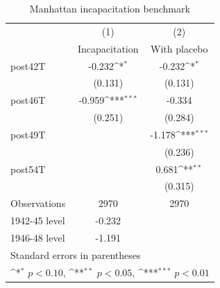 \begin{table}[htbp]\centering
\def\sym#1{\ifmmode^{#1}\else\(^{#1}\)\fi}
\caption{Manhattan incapacitation benchmark}
\begin{tabular}{l*{2}{c}}
\toprule
                    &\multicolumn{1}{c}{(1)}&\multicolumn{1}{c}{(2)}\\
                    &\multicolumn{1}{c}{Incapacitation}&\multicolumn{1}{c}{With placebo}\\
\midrule
post42T             &      -0.232\sym{*}  &      -0.232\sym{*}  \\
                    &     (0.131)         &     (0.131)         \\
\addlinespace
post46T             &      -0.959\sym{***}&      -0.334         \\
                    &     (0.251)         &     (0.284)         \\
\addlinespace
post49T             &                     &      -1.178\sym{***}\\
                    &                     &     (0.236)         \\
\addlinespace
post54T             &                     &       0.681\sym{**} \\
                    &                     &     (0.315)         \\
\midrule
Observations        &        2970         &        2970         \\
1942-45 level       &      -0.232         &                     \\
1946-48 level       &      -1.191         &                     \\
\bottomrule
\multicolumn{3}{l}{\footnotesize Standard errors in parentheses}\\
\multicolumn{3}{l}{\footnotesize \sym{*} \(p<0.10\), \sym{**} \(p<0.05\), \sym{***} \(p<0.01\)}\\
\end{tabular}
\end{table}
